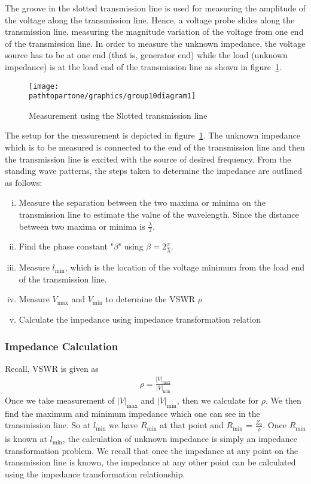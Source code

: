 The groove in the slotted transmission line is used for measuring the amplitude of the voltage along the transmission line. Hence, a voltage probe slides along the transmission line, measuring the magnitude variation of the voltage from one end of the transmission line. In order to measure the unknown impedance, the voltage source has to be at one end (that is, generator end) while the load (unknown impedance) is at the load end of the transmission line as shown in figure~\ref{fig:group10diagram1}.
\begin{figure}[h]
\centering
\texttt{[image: \\pathtopartone/graphics/group10diagram1]}
\caption{Measurement using the Slotted transmission line}
\label{fig:group10diagram1}
\end{figure}

The setup for the measurement is depicted in figure~\ref{fig:group10diagram1}. The unknown impedance which is to be measured is connected to the end of the transmission line and then the transmission line is excited with the source of desired frequency. From the standing wave patterns, the steps taken to determine the impedance are outlined as follows:
\begin{enumerate}[(i)]
\item Measure the separation between the two maxima or minima on the transmission line to estimate the value of the wavelength. Since the distance between two maxima or minima is $\frac{\lambda}{2}$.
\item Find the phase constant "$\beta$" using $\beta = 2\frac{\pi}{\lambda}$.
\item Measure $l_\min$, which is the location of the voltage minimum from the load end of the transmission line.
\item Measure $V_\max$ and $V_\min$ to determine the VSWR $\rho$
\item Calculate the impedance using impedance transformation relation
\end{enumerate}

\subsubsection{Impedance Calculation}
Recall, VSWR is given as
\begin{align}
\rho = \frac{|V|_\max}{|V|_\min}
\end{align}
Once we take measurement of $|V|_\max$ and $|V|_\min$, then we calculate for $ \rho $. We then find the maximum and minimum impedance which one can see in the transmission line. So at $l_\min$ we have $R_\min$ at that point and $R_\min$ = $\frac{Z_0}{\rho}$. Once $R_\min$ is known at $l_\min$, the calculation of unknown impedance is simply an impedance transformation problem. We recall that once the impedance at any point on the transmission line is known, the impedance at any other point can be calculated using the impedance transformation relationship.

